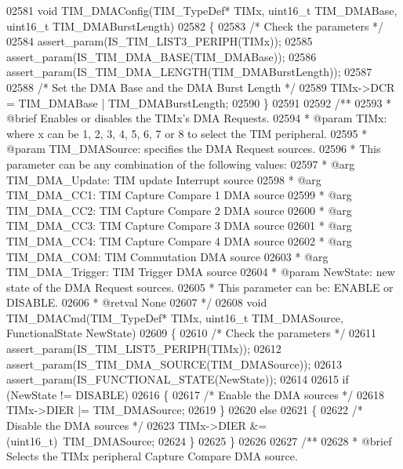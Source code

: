 \begin{DoxyCode}
02581 \textcolor{keywordtype}{void} TIM_DMAConfig(TIM\_TypeDef* TIMx, uint16\_t TIM\_DMABase, uint16\_t TIM\_DMABurstLength)
02582 \{
02583   \textcolor{comment}{/* Check the parameters */}
02584   assert_param(IS\_TIM\_LIST3\_PERIPH(TIMx));
02585   assert_param(IS\_TIM\_DMA\_BASE(TIM\_DMABase));
02586   assert_param(IS\_TIM\_DMA\_LENGTH(TIM\_DMABurstLength));
02587 
02588   \textcolor{comment}{/* Set the DMA Base and the DMA Burst Length */}
02589   TIMx->DCR = TIM\_DMABase | TIM\_DMABurstLength;
02590 \}
02591 
02592 \textcolor{comment}{/**}
02593 \textcolor{comment}{  * @brief  Enables or disables the TIMx's DMA Requests.}
02594 \textcolor{comment}{  * @param  TIMx: where x can be 1, 2, 3, 4, 5, 6, 7 or 8 to select the TIM peripheral.}
02595 \textcolor{comment}{  * @param  TIM\_DMASource: specifies the DMA Request sources.}
02596 \textcolor{comment}{  *          This parameter can be any combination of the following values:}
02597 \textcolor{comment}{  *            @arg TIM\_DMA\_Update: TIM update Interrupt source}
02598 \textcolor{comment}{  *            @arg TIM\_DMA\_CC1: TIM Capture Compare 1 DMA source}
02599 \textcolor{comment}{  *            @arg TIM\_DMA\_CC2: TIM Capture Compare 2 DMA source}
02600 \textcolor{comment}{  *            @arg TIM\_DMA\_CC3: TIM Capture Compare 3 DMA source}
02601 \textcolor{comment}{  *            @arg TIM\_DMA\_CC4: TIM Capture Compare 4 DMA source}
02602 \textcolor{comment}{  *            @arg TIM\_DMA\_COM: TIM Commutation DMA source}
02603 \textcolor{comment}{  *            @arg TIM\_DMA\_Trigger: TIM Trigger DMA source}
02604 \textcolor{comment}{  * @param  NewState: new state of the DMA Request sources.}
02605 \textcolor{comment}{  *          This parameter can be: ENABLE or DISABLE.}
02606 \textcolor{comment}{  * @retval None}
02607 \textcolor{comment}{  */}
02608 \textcolor{keywordtype}{void} TIM_DMACmd(TIM\_TypeDef* TIMx, uint16\_t TIM\_DMASource, FunctionalState NewState)
02609 \{
02610   \textcolor{comment}{/* Check the parameters */}
02611   assert_param(IS\_TIM\_LIST5\_PERIPH(TIMx));
02612   assert_param(IS\_TIM\_DMA\_SOURCE(TIM\_DMASource));
02613   assert_param(IS\_FUNCTIONAL\_STATE(NewState));
02614 
02615   \textcolor{keywordflow}{if} (NewState != DISABLE)
02616   \{
02617     \textcolor{comment}{/* Enable the DMA sources */}
02618     TIMx->DIER |= TIM\_DMASource;
02619   \}
02620   \textcolor{keywordflow}{else}
02621   \{
02622     \textcolor{comment}{/* Disable the DMA sources */}
02623     TIMx->DIER &= (uint16\_t)~TIM\_DMASource;
02624   \}
02625 \}
02626 
02627 \textcolor{comment}{/**}
02628 \textcolor{comment}{  * @brief  Selects the TIMx peripheral Capture Compare DMA source.}

\end{DoxyCode}

